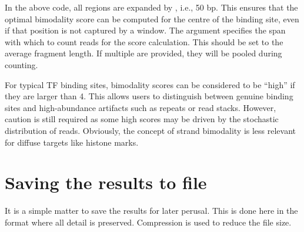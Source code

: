 \documentclass{report}\usepackage[]{graphicx}\usepackage[usenames,dvipsnames]{color}
\newcommand{\hlnum}[1]{\textcolor[rgb]{0.816,0.125,0.439}{#1}}%
\newcommand{\hlstr}[1]{\textcolor[rgb]{0.251,0.627,0.251}{#1}}%
\newcommand{\hlopt}[1]{\textcolor[rgb]{0,0,0}{#1}}%
\newcommand{\hlstd}[1]{\textcolor[rgb]{0.251,0.251,0.251}{#1}}%
\newcommand{\hlkwb}[1]{\textcolor[rgb]{0,0,0}{#1}}%
\newcommand{\hlkwc}[1]{\textcolor[rgb]{0.251,0.251,0.251}{#1}}%
\newcommand{\hlkwd}[1]{\textcolor[rgb]{0.878,0.439,0.125}{#1}}%
\newenvironment{knitrout}{}{} %
\begin{document}
\begin{knitrout}
\color{fgcolor}
\end{knitrout}

In the above code, all regions are expanded by , i.e., 50 bp.
This ensures that the optimal bimodality score can be computed for the centre of the binding site, even if that position is not captured by a window.
The  argument specifies the span with which to count reads for the score calculation.
This should be set to the average fragment length.
If multiple  are provided, they will be pooled during counting.

For typical TF binding sites, bimodality scores can be considered to be ``high'' if they are larger than 4.
This allows users to distinguish between genuine binding sites and high-abundance artifacts such as repeats or read stacks.
However, caution is still required as some high scores may be driven by the stochastic distribution of reads.
Obviously, the concept of strand bimodality is less relevant for diffuse targets like histone marks.

\section{Saving the results to file}
It is a simple matter to save the results for later perusal. 
This is done here in the  format where all detail is preserved. 
Compression is used to reduce the file size. 

\begin{knitrout}
\color{fgcolor}
\end{knitrout}
\end{document}
